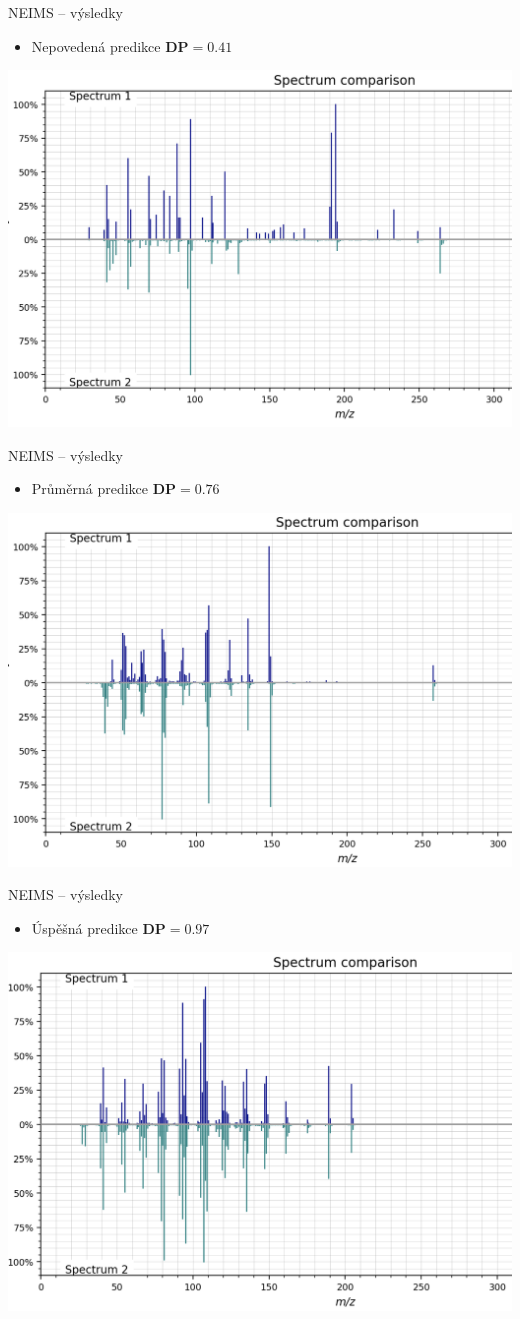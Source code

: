 \documentclass[aspectratio=169]{beamer}
\begin{document}
\begin{frame}
{NEIMS -- výsledky}
\begin{itemize}
\item Nepovedená predikce $\textbf{DP} = 0.41$
\end{itemize}
\includegraphics[width=.6\hsize]{compare_041}
\end{frame}

\begin{frame}
{NEIMS -- výsledky}
\begin{itemize}
\item Průměrná predikce $\textbf{DP} = 0.76$
\end{itemize}
\includegraphics[width=.6\hsize]{compare_076}
\end{frame}


\begin{frame}
{NEIMS -- výsledky}
\begin{itemize}
\item Úspěšná predikce $\textbf{DP} = 0.97$
\end{itemize}
\includegraphics[width=.6\hsize]{compare_097}
\end{frame}
\end{document}
